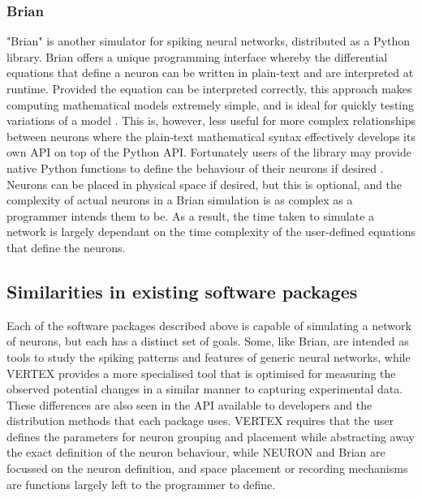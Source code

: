 \subsubsection{Brian}

"Brian" is another simulator for spiking neural networks, distributed as a
Python library. Brian offers a unique programming interface whereby the
differential equations that define a neuron can be written in plain-text and are
interpreted at runtime. Provided the equation can be interpreted correctly, this
approach makes computing mathematical models extremely simple, and is ideal for
quickly testing variations of a model \autocite{stimberg_brian_2019}. This is,
however, less useful for more complex relationships between neurons where the
plain-text mathematical syntax effectively develops its own API on top of the
Python API. Fortunately users of the library may provide native Python functions
to define the behaviour of their neurons if desired
\autocite{noauthor_functions_2020}. Neurons can be placed in physical space if
desired, but this is optional, and the complexity of actual neurons in a Brian
simulation is as complex as a programmer intends them to be. As a result, the
time taken to simulate a network is largely dependant on the time complexity of
the user-defined equations that define the neurons.

\subsection{Similarities in existing software packages}

Each of the software packages described above is capable of simulating a
network of neurons, but each has a distinct set of goals. Some, like Brian, are
intended as tools to study the spiking patterns and features of generic neural
networks, while VERTEX provides a more specialised tool that is optimised for
measuring the observed potential changes in a similar manner to capturing
experimental data. These differences are also seen in the API available to
developers
and the distribution methods that each package uses. VERTEX requires that the
user defines the parameters for neuron grouping and placement while abstracting
away the exact definition of the neuron behaviour, while NEURON and Brian are focussed on the neuron definition, and space placement or recording
mechanisms are functions largely left to the programmer to define.